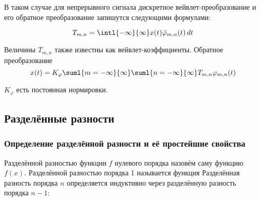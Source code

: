 \documentclass[a4paper]{article}
\begin{document}
В таком случае для непрерывного сигнала дискретное
вейвлет-преобразование и его обратное преобразование запишутся
следующими формулами:

\begin{displaymath}
  T_{m,n} = \intl{-\infty}{\infty} x(t) {\bar\varphi}_{m,n} (t)\,dt 
\end{displaymath}

Величины $ T_{m,n} $ также известны как вейвлет-коэффициенты.
Обратное преобразование 
\begin{displaymath}
  x(t) = K_{\varphi} \suml{m=-\infty}{\infty} \suml{n=-\infty}{\infty} T_{m,n} {\varphi}_{m,n}(t) 
\end{displaymath}

$K_{\varphi}$ есть постоянная нормировки.
\subsection{Разделённые разности}

\subsubsection{Определение разделённой разности и её простейшие свойства}

\begin{df}
Разделённой разностью функции $f$ нулевого порядка назовём саму
функцию $f(x)$. Разделённой разностью порядка 1 называется функция
  Разделённая
разность порядка $n$ определяется индуктивно через разделённую
разность порядка $n-1$: 
\end{df}
\end{document}
